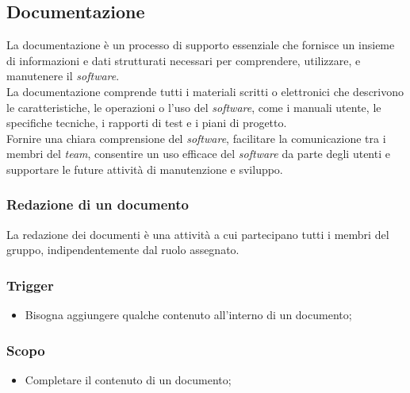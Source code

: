 \subsection{Documentazione}
La documentazione è un processo di supporto essenziale che fornisce un insieme di informazioni e dati strutturati necessari per comprendere, utilizzare, e manutenere il \textit{software}.\\
La documentazione comprende tutti i materiali scritti o elettronici che descrivono le caratteristiche, le operazioni o l'uso del \textit{software}, come i manuali utente, le specifiche tecniche, i rapporti di test e i piani di progetto.\\
Fornire una chiara comprensione del \textit{software}, facilitare la comunicazione tra i membri del \textit{team}, consentire un uso efficace del \textit{software} da parte degli utenti e supportare le future attività di manutenzione e sviluppo.





\subsubsection{Redazione di un documento}
\label{redazione-documento}
La redazione dei documenti è una attività a cui partecipano tutti i membri del gruppo, indipendentemente dal ruolo assegnato.

\subsubsection*{Trigger}
\begin{itemize}
	\item Bisogna aggiungere qualche contenuto all'interno di un documento;
\end{itemize}

\subsubsection*{Scopo}
\begin{itemize}
	\item Completare il contenuto di un documento;
\end{itemize}

